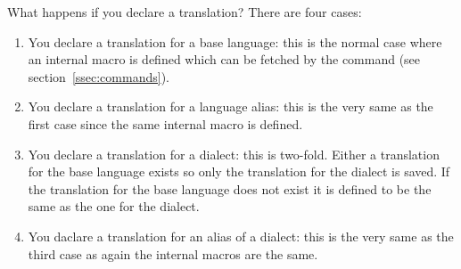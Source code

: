 \documentclass[DIV11,toc=index,toc=bib,numbers=noendperiod]{cnpkgdoc}
\begin{document}
What happens if you declare a translation? There are four cases:
\begin{enumerate}
  \item You declare a translation for a base language: this is the normal case
    where an internal macro is defined which can be fetched by the
     command (see section~\ref{ssec:commands}).
  \item You declare a translation for a language alias: this is the very same
    as the first case since the same internal macro is defined.
  \item You declare a translation for a dialect: this is two-fold.  Either a
    translation for the base language exists so only the translation for the
    dialect is saved.  If the translation for the base language does not exist
    it is defined to be the same as the one for the dialect.
  \item You daclare a translation for an alias of a dialect: this is the very
    same as the third case as again the internal macros are the same.
\end{enumerate}
\end{document}
